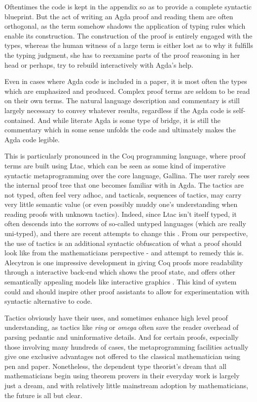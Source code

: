 Oftentimes the code is kept in the appendix so as to provide a complete
syntactic blueprint. But the act of writing an Agda proof and reading them are
often orthogonal, as the term somehow shadows the application of typing rules
which enable its construction. The construction of the proof is
entirely engaged with the types, whereas the human witness of a large term is
either lost as to why it fulfills the typing judgment, she has to reexamine
parts of the proof reasoning in her head or perhaps, try to rebuild 
interactively with Agda's help.

Even in cases where Agda code is included in a paper, it is most often the types
which are emphasized and produced. Complex proof terms are seldom to be read on
their own terms. The natural language description and commentary is still
largely necessary to convey whatever results, regardless if the Agda code is
self-contained. And while literate Agda is some type of bridge, it is still the
commentary which in some sense unfolds the code and ultimately makes the Agda
code legible.

This is particularly pronounced in the Coq programming language, where proof
terms are built using Ltac, which can be seen as some kind of imperative
syntactic metaprogramming over the core language, Gallina. The user rarely sees
the internal proof tree that one becomes familiar with in Agda. The tactics are
not typed, often feel very adhoc, and tacticals, sequences of tactics, may carry
very little semantic value (or even possibly muddy one's understanding when
reading proofs with unknown tactics). Indeed, since Ltac isn't itself typed, it
often descends into the sorrows of so-called untyped languages (which are really
uni-typed), and there are recent attempts to change this \cite{mtac2}
\cite{ltac2}. From our perspective, the use of tactics is an additional syntactic obfuscation
of what a proof should look like from the mathematicians perspective - and
attempt to remedy this is. Alecytron is one impressive development in giving Coq
proofs more readability through a interactive back-end which shows the proof
state, and offers other semantically appealing models like interactive graphics
\cite{coqAlec}. This kind of system could and should inspire other proof
assistants to allow for experimentation with syntactic alternative to code.

Tactics obviously have their uses, and sometimes enhance high level proof
understanding, as tactics like \emph{ring} or \emph{omega} often save the reader overhead
of parsing pedantic and uninformative details. And for certain proofs,
especially those involving many hundreds of cases, the metaprogramming
facilities actually give one exclusive advantages not offered to the classical
mathematician using pen and paper. Nonetheless, the dependent type theorist's
dream that all mathematicians begin using theorem provers in their everyday work
is largely just a dream, and with relatively little mainstream adoption by
mathematicians, the future is all but clear.

